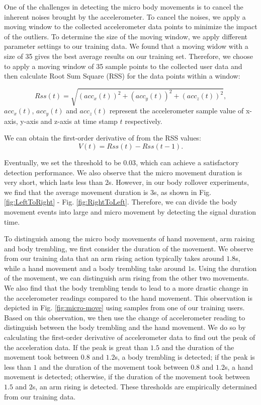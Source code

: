 One of the challenges in detecting the micro body movements is to cancel the inherent noises brought by the accelerometer.
To cancel the noises, we apply a moving window to the collected accelerometer data points to minimize the impact of the outliers. To determine the size of the moving window, we apply different parameter settings to our training data. We found that a moving widow with a size of 35 gives the best average results on our training set. Therefore, we choose to apply a moving window of 35 sample points to the collected user data and then calculate Root Sum Square (RSS) for the data points within a window:

\begin{equation}
      Rss(t) =\sqrt{(acc_x(t))^{2}+(acc_y(t))^{2}+(acc_z(t))^{2}},
\end{equation}
$acc_x(t)$, $acc_y(t)$ and $acc_z(t)$ represent the accelerometer sample value of x-axis, y-axis and z-axis at time stamp $t$ respectively.


We can obtain the first-order derivative of from the RSS values:
\begin{equation}
      V(t)=Rss(t)-Rss(t-1).
\end{equation}

Eventually, we set the threshold to be $0.03$, which can achieve a satisfactory detection performance. We also observe that the micro movement duration is very short, which lasts less than $2$s. However, in our body rollover experiments, we find that the average movement duration is $3$s, as shown in Fig. \ref{fig:LeftToRight} - Fig. \ref{fig:RightToLeft}.
Therefore, we can divide the body movement events into large and micro movement by detecting the signal duration time.

To distinguish among the micro body movements of hand movement, arm raising and body trembling, we first consider the
duration of the movement. We observe from our training data that an arm rising action typically takes around $1.8$s, while a hand movement and a body trembling take around $1$s. Using the duration of the movement, we can distinguish arm rising from the other two movements. We also find that the body trembling tends to lead to a more drastic change in the accelerometer readings compared to the hand movement. This observation is depicted in Fig. \ref{fig:micro-move} using samples from one of our training users. Based on this observation, we then use the change of accelerometer reading to distinguish between the body trembling and the hand movement. We do so by calculating the first-order derivative of accelerometer data to find out the peak of the acceleration data.  If the peak is great than $1.5$ and the duration of the movement took between $0.8$ and $1.2$s, a body trembling is detected; if the peak is less than $1$ and the duration of the movement
took between $0.8$ and $1.2$s, a hand movement is detected; otherwise, if the duration of the movement took between $1.5$ and $2$s, an arm rising is detected. These thresholds are empirically determined from our training data.


